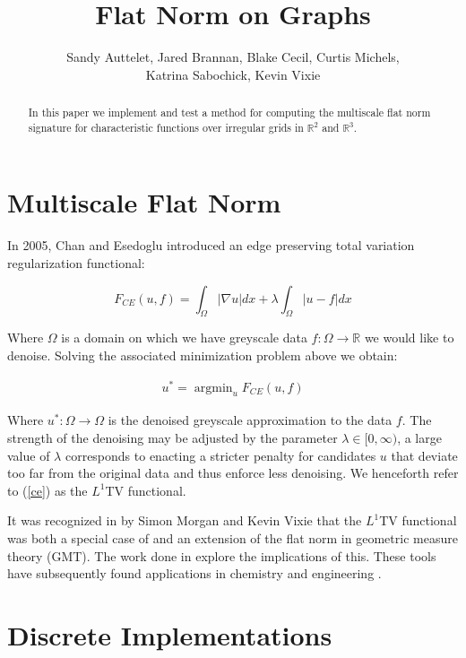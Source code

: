 \documentclass[12pt]{article}
\title{Flat Norm on Graphs}
\author{Sandy Auttelet, Jared Brannan, Blake Cecil, Curtis Michels,\\
 Katrina Sabochick, Kevin Vixie }
\DeclareMathOperator*{\argmin}{argmin}
\begin{document}
\maketitle

\begin{abstract}
In this paper we implement and test a method for computing the multiscale flat norm signature for characteristic functions over irregular grids in $\mathbb{R}^2$ and $\mathbb{R}^3$.
\end{abstract}

\tableofcontents

\section{Multiscale Flat Norm}

In 2005, Chan and Esedoglu introduced an edge preserving total variation regularization functional:

\begin{equation} \label{ce}
F_{CE}(u,f) = \int_\Omega |\nabla u| dx + \lambda \int_{\Omega} |u-f|dx
\end{equation}

Where $\Omega$ is a domain on which we have greyscale data $f:\Omega \to \mathbb{R}$ we would like to denoise. Solving the associated minimization problem above we obtain:

\begin{align*}
u^* = \argmin_u F_{CE}(u,f)
\end{align*}

Where $u^*: \Omega \rightarrow \Omega$ is the denoised greyscale approximation to the data $f$. The strength of the denoising may be adjusted by the parameter $\lambda \in [0,\infty)$, a large value of $\lambda$ corresponds to enacting a stricter penalty for candidates $u$ that deviate too far from the original data and thus enforce less denoising. We henceforth refer to (\ref{ce}) as the $L^1$TV functional.

It was recognized in \cite{Morgan_2007} by Simon Morgan and Kevin Vixie that the $L^1$TV functional was both a special case of and an extension of the flat norm in geometric measure theory (GMT). The work done in \cite{shapes, hu_median, ibrahim_simplicial, fn_decomp} explore the implications of this. These tools have subsequently found applications in chemistry \cite{flat_norm_chemistry_fingers} and engineering \cite{meyur2023structural, aouada2009squigraphs}.


\section{Discrete Implementations}
\end{document}
